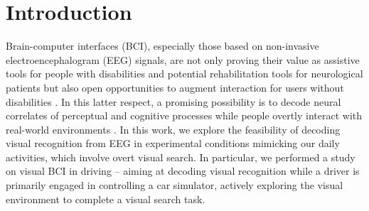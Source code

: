 \documentclass[12pt]{iopart}
\begin{document}

\section{Introduction}
\label{sec:intro}

Brain-computer interfaces (BCI), especially those based on 
non-invasive electroencephalogram (EEG) signals, are not only
proving their value as assistive tools for people 
with disabilities
\cite{birbaumer_spelling_1999,wolpaw_control_2004,holz_braincomputer_2013,leeb_towards_2015,saeedi_long-term_2017,perdikis_cybathlon_2018}
and potential rehabilitation tools for
neurological patients
\cite{ramos-murguialday_brain-machine-interface_2013,pichiorri_braincomputer_2015,biasiucci_brain-actuated_2018,cervera_braincomputer_2018}
but also open opportunities 
to augment interaction for users without disabilities \cite{zhang_eeg-based_2015,khaliliardali_action_2015,chavarriaga_decoding_2018}. In this
latter respect, a promising possibility is to decode neural
correlates of perceptual and cognitive processes while people
overtly interact with real-world environments
\cite{uscumlic_iterative_2013,jangraw_neurally_2014,haufe_electrophysiology-based_2014}.
In this work, we explore the feasibility of decoding visual recognition
from EEG in experimental conditions mimicking our
daily activities, which involve overt visual search. In particular,
we performed a study on visual BCI in
driving -- aiming at decoding visual recognition
while a driver is primarily engaged in controlling a car simulator,
actively exploring the visual environment to complete a visual search task.
\end{document}
